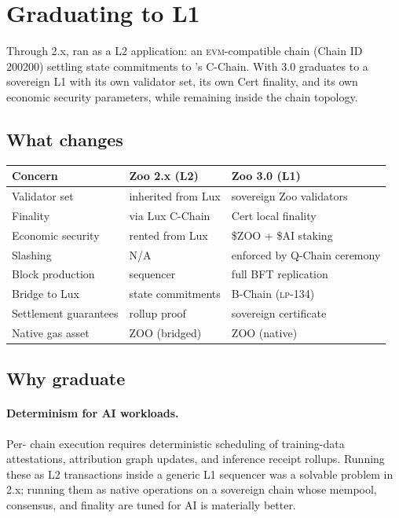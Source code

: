 \section{Graduating to L1}
\label{sec:l1-graduation}

Through 2.x, \Zoo{} ran as a \Lux{} L2 application: an \textsc{evm}-compatible
chain (Chain ID 200200) settling state commitments to \Lux{}'s C-Chain. With
3.0 \Zoo{} graduates to a sovereign L1 with its own validator set, its own
\Quasar{}Cert finality, and its own economic security parameters, while
remaining inside the \Lux{} chain topology.

\subsection{What changes}

\begin{longtable}{p{}p{}p{}}
\toprule
\textbf{Concern} & \textbf{Zoo 2.x (L2)} & \textbf{Zoo 3.0 (L1)} \\
\midrule
Validator set & inherited from Lux & sovereign Zoo validators \\
Finality & via Lux C-Chain & \Quasar{}Cert local finality \\
Economic security & rented from Lux & \$ZOO + \$AI staking \\
Slashing & N/A & enforced by Q-Chain ceremony \\
Block production & sequencer & full BFT replication \\
Bridge to Lux & state commitments & B-Chain (\textsc{lp-134}) \\
Settlement guarantees & rollup proof & sovereign certificate \\
Native gas asset & ZOO (bridged) & ZOO (native) \\
\bottomrule
\end{longtable}

\subsection{Why graduate}

\paragraph{Determinism for AI workloads.} Per-\LLM{} chain execution
\cite{zoo-per-llm-chains} requires deterministic scheduling of training-data
attestations, attribution graph updates, and inference receipt rollups.
Running these as L2 transactions inside a generic L1 sequencer was a
solvable problem in 2.x; running them as native operations on a sovereign
chain whose mempool, consensus, and finality are tuned for AI is materially
better.

